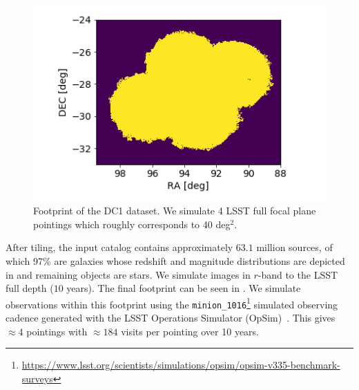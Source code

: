 \documentclass[twocolumn]{aastex62}
\begin{document}
\begin{figure}
\centering
\includegraphics[width=0.9\columnwidth]{footprint.png}
\caption{Footprint of the DC1 dataset. We simulate 4 LSST full focal plane pointings which roughly corresponds to 40 deg$^{2}$.}
\label{fig:footprint}
\end{figure}


After tiling, the input catalog contains approximately $63.1$ million sources, of which 97\% are galaxies whose redshift and magnitude distributions are depicted in  and remaining objects are stars. We simulate images in $r$-band to the LSST full depth ($10$ years). The final footprint can be seen in . We simulate observations within this footprint using the \texttt{minion\_1016}\footnote{\url{https://www.lsst.org/scientists/simulations/opsim/opsim-v335-benchmark-surveys}} simulated observing cadence generated with the LSST Operations Simulator (OpSim)~\citep{2014SPIE.9150E..15D}. This gives $\approx 4$ pointings with $\approx 184$ visits per pointing over 10 years.
\end{document}
